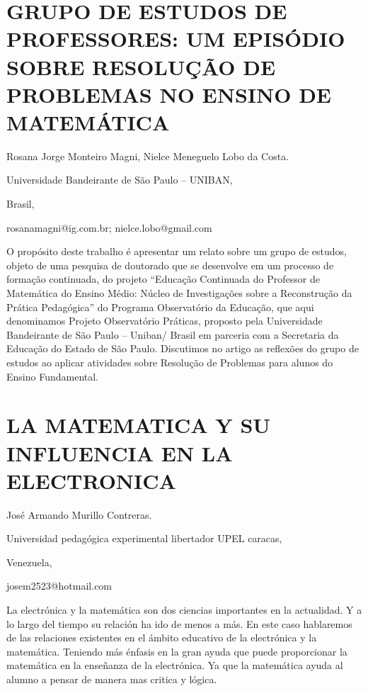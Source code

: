\section{GRUPO DE ESTUDOS DE PROFESSORES: UM EPISÓDIO SOBRE RESOLUÇÃO DE PROBLEMAS
NO ENSINO DE MATEMÁTICA }

\begin{datos}

Rosana Jorge Monteiro Magni, Nielce Meneguelo Lobo da Costa.

Universidade Bandeirante de São Paulo – UNIBAN,

Brasil,

rosanamagni@ig.com.br; nielce.lobo@gmail.com

\end{datos}

O propósito deste trabalho é apresentar um relato sobre um grupo de
estudos, objeto de uma pesquisa de doutorado que se desenvolve em
um processo de formação continuada, do projeto “Educação Continuada
do Professor de Matemática do Ensino Médio: Núcleo de Investigações
sobre a Reconstrução da Prática Pedagógica” do Programa Observatório
da Educação, que aqui denominamos Projeto Observatório Práticas, proposto
pela Universidade Bandeirante de São Paulo – Uniban/ Brasil em parceria
com a Secretaria da Educação do Estado de São Paulo. Discutimos no
artigo as reflexões do grupo de estudos ao aplicar atividades sobre
Resolução de Problemas para alunos do Ensino Fundamental.


\section{LA MATEMATICA Y SU INFLUENCIA EN LA ELECTRONICA }

\begin{datos}

José Armando Murillo Contreras.

Universidad pedagógica experimental libertador UPEL caracas,

Venezuela,

josem2523@hotmail.com 

\end{datos}

La electrónica y la matemática son dos ciencias importantes en la
actualidad. Y a lo largo del tiempo su relación ha ido de menos a
más. En este caso hablaremos de las relaciones existentes en el ámbito
educativo de la electrónica y la matemática. Teniendo más énfasis
en la gran ayuda que puede proporcionar la matemática en la enseñanza
de la electrónica. Ya que la matemática ayuda al alumno a pensar de
manera mas critica y lógica.


